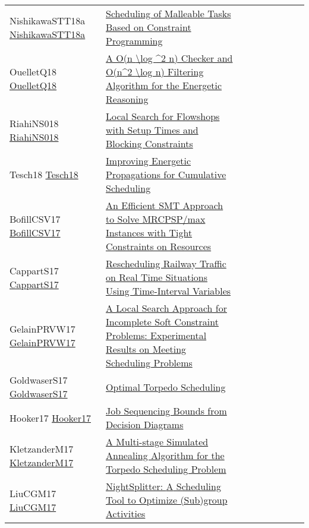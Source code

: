 {\begin{longtable}{p{3cm}p{7cm}lllllll}
NishikawaSTT18a \href{https://doi.org/10.1109/TENCON.2018.8650168}{NishikawaSTT18a} &  \href{papers/NishikawaSTT18a.pdf}{Scheduling of Malleable Tasks Based on Constraint Programming} &  &  &  &  &  &  & \\
OuelletQ18 \href{https://doi.org/10.1007/978-3-319-93031-2\_34}{OuelletQ18} &  \href{papers/OuelletQ18.pdf}{A O(n {\textbackslash}log {\^{}}2 n) Checker and O(n{\^{}}2 {\textbackslash}log n) Filtering Algorithm for the Energetic Reasoning} &  &  &  &  &  &  & \\
RiahiNS018 \href{https://aaai.org/ocs/index.php/ICAPS/ICAPS18/paper/view/17755}{RiahiNS018} &  \href{papers/RiahiNS018.pdf}{Local Search for Flowshops with Setup Times and Blocking Constraints} &  &  &  &  &  &  & \\
Tesch18 \href{https://doi.org/10.1007/978-3-319-98334-9\_41}{Tesch18} &  \href{papers/Tesch18.pdf}{Improving Energetic Propagations for Cumulative Scheduling} &  &  &  &  &  &  & \\
BofillCSV17 \href{https://doi.org/10.1007/978-3-319-66158-2\_5}{BofillCSV17} &  \href{papers/BofillCSV17.pdf}{An Efficient {SMT} Approach to Solve MRCPSP/max Instances with Tight Constraints on Resources} &  &  &  &  &  &  & \\
CappartS17 \href{https://doi.org/10.1007/978-3-319-59776-8\_26}{CappartS17} &  \href{papers/CappartS17.pdf}{Rescheduling Railway Traffic on Real Time Situations Using Time-Interval Variables} &  &  &  &  &  &  & \\
GelainPRVW17 \href{https://doi.org/10.1007/978-3-319-59776-8\_32}{GelainPRVW17} &  \href{papers/GelainPRVW17.pdf}{A Local Search Approach for Incomplete Soft Constraint Problems: Experimental Results on Meeting Scheduling Problems} &  &  &  &  &  &  & \\
GoldwaserS17 \href{https://doi.org/10.1007/978-3-319-66158-2\_22}{GoldwaserS17} &  \href{papers/GoldwaserS17.pdf}{Optimal Torpedo Scheduling} &  &  &  &  &  &  & \\
Hooker17 \href{https://doi.org/10.1007/978-3-319-66158-2\_36}{Hooker17} &  \href{papers/Hooker17.pdf}{Job Sequencing Bounds from Decision Diagrams} &  &  &  &  &  &  & \\
KletzanderM17 \href{https://doi.org/10.1007/978-3-319-59776-8\_28}{KletzanderM17} &  \href{papers/KletzanderM17.pdf}{A Multi-stage Simulated Annealing Algorithm for the Torpedo Scheduling Problem} &  &  &  &  &  &  & \\
LiuCGM17 \href{https://doi.org/10.1007/978-3-319-66158-2\_24}{LiuCGM17} &  \href{papers/LiuCGM17.pdf}{NightSplitter: {A} Scheduling Tool to Optimize (Sub)group Activities} &  &  &  &  &  &  & \\

\end{longtable}}
